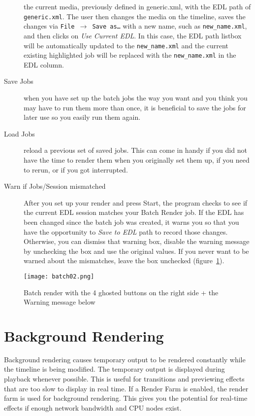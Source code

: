 \begin{description}
  the current media, previously defined in generic.xml, with the EDL
  path of \texttt{generic.xml}.  The user then changes the media on
  the timeline, saves the changes via \texttt{File $\rightarrow$ Save
    as\dots} with a new name, such as \texttt{new\_name.xml}, and then
  clicks on \textit{Use Current EDL}.  In this case, the EDL path
  listbox will be automatically updated to the \texttt{new\_name.xml}
  and the current existing highlighted job will be replaced with the
  \texttt{new\_name.xml} in the EDL column.
\item[Save Jobs] when you have set up the batch jobs the way you
  want and you think you may have to run them more than once, it is
  beneficial to save the jobs for later use so you easily run them
  again.
\item[Load Jobs] reload a previous set of saved jobs.  This can come
  in handy if you did not have the time to render them when you
  originally set them up, if you need to rerun, or if you got
  interrupted.
\item[Warn if Jobs/Session mismatched] After you set up your render
  and press Start, the program checks to see if the current EDL
  session matches your Batch Render job.  If the EDL has been changed
  since the batch job was created, it warns you so that you have the
  opportunity to \textit{Save to EDL} path to record those changes.
  Otherwise, you can dismiss that warning box, disable the warning
  message by unchecking the box and use the original values.  If you
  never want to be warned about the mismatches, leave the box
  unchecked (figure~\ref{fig:batch02}).
\end{description}

\begin{figure}[htpb] \centering
  \texttt{[image: batch02.png]}
  \caption{Batch render with the 4 ghosted buttons on the right side
    + the Warning message below}
  \label{fig:batch02}
\end{figure}

\section{Background Rendering}%
\label{sec:background_rendering}

Background rendering causes temporary output to be rendered
constantly while the timeline is being modified. The temporary
output is displayed during playback whenever possible. This is
useful for transitions and previewing effects that are too slow to
display in real time. If a Render Farm is enabled, the render farm
is used for background rendering. This gives you the potential for
real-time effects if enough network bandwidth and CPU nodes exist.

